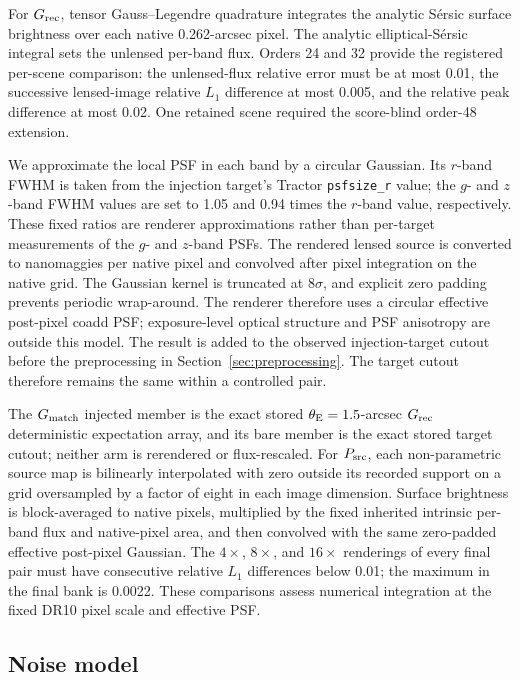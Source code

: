 For \(G_{\rm rec}\), tensor Gauss--Legendre quadrature integrates the
analytic S\'{e}rsic surface brightness over each native
0.262-arcsec pixel. The analytic elliptical-S\'{e}rsic integral sets the
unlensed per-band flux. Orders 24 and 32 provide the registered per-scene
comparison: the unlensed-flux relative error must be at most 0.01, the
successive lensed-image relative \(L_1\) difference at most 0.005, and the
relative peak difference at most 0.02. One retained scene required the
score-blind order-48 extension.

We approximate the local PSF in each band by a circular Gaussian. Its
\(r\)-band FWHM is
taken from the injection target's Tractor \texttt{psfsize\_r} value; the
\(g\)- and \(z\)-band FWHM values are set to 1.05 and 0.94 times the \(r\)-band
value, respectively. These fixed ratios are renderer approximations rather
than per-target measurements of the $g$- and $z$-band PSFs. The rendered
lensed source is converted to nanomaggies per native pixel and convolved
after pixel integration on the native grid. The Gaussian kernel is truncated
at \(8\sigma\), and explicit zero padding prevents periodic wrap-around.
The renderer therefore uses a circular effective post-pixel coadd PSF;
exposure-level optical structure and PSF anisotropy are outside this model.
The result is added to the observed
injection-target cutout before the preprocessing in
Section~\ref{sec:preprocessing}. The target cutout therefore remains the
same within a controlled pair.

The \(G_{\rm match}\) injected member is the exact stored
\(\theta_{\rm E}=1.5\)-arcsec \(G_{\rm rec}\) deterministic expectation array, and its bare
member is the exact stored target cutout; neither arm is rerendered or
flux-rescaled. For \(P_{\rm src}\), each non-parametric source map is
bilinearly interpolated with zero outside its recorded support on a grid
oversampled by a factor of eight in each image dimension. Surface brightness
is block-averaged to native pixels, multiplied by the fixed inherited intrinsic
per-band flux and native-pixel area, and then convolved with the same
zero-padded effective post-pixel Gaussian. The \(4\times\), \(8\times\), and
\(16\times\) renderings of every final pair must have consecutive relative
\(L_1\) differences below 0.01; the maximum in the final bank is 0.0022.
These comparisons assess numerical integration at the fixed DR10 pixel scale
and effective PSF.

\subsection{Noise model}
\label{sec:noise_model}

